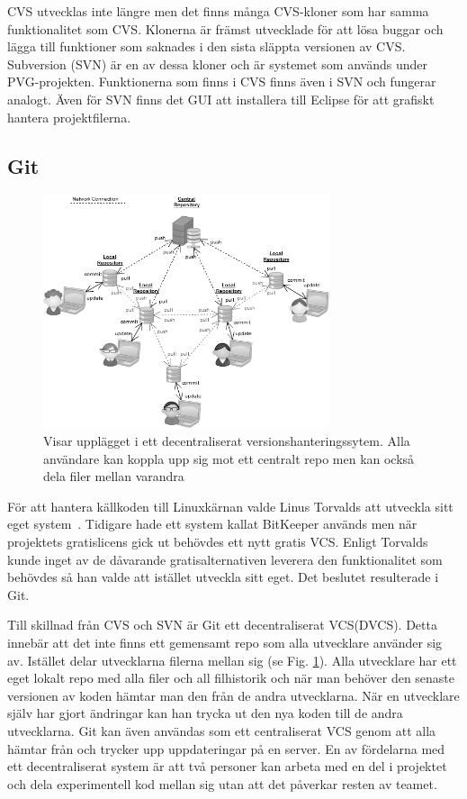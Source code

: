 	CVS utvecklas inte längre men det finns många CVS-kloner som har samma funktionalitet som CVS. Klonerna är främst utvecklade för att lösa buggar och lägga till funktioner som saknades i den sista släppta versionen av CVS. Subversion (SVN) är en av dessa kloner och är systemet som används under PVG-projekten. Funktionerna som finns i CVS finns även i SVN och fungerar analogt. Även för SVN finns det GUI att installera till Eclipse för att grafiskt hantera projektfilerna. 
 

\subsection{Git}

\begin{figure}[htb!]\centering\includegraphics[width=0.75\textwidth]{DVCS.png}\caption{Visar upplägget i ett decentraliserat versionshanteringssytem. Alla användare kan koppla upp sig mot ett centralt repo men kan också dela filer mellan varandra}\label{fig:DVCSPic}\end{figure}


För att hantera källkoden till Linuxkärnan valde Linus Torvalds att utveckla sitt eget system~\cite{Torvalds}. Tidigare hade ett system kallat BitKeeper används men när projektets gratislicens gick ut behövdes ett nytt gratis VCS. Enligt Torvalds kunde inget av de dåvarande gratisalternativen leverera den funktionalitet som behövdes så han valde att istället utveckla sitt eget. Det beslutet resulterade i Git.

Till skillnad från CVS och SVN är Git ett decentraliserat VCS(DVCS). Detta innebär att det inte finns ett gemensamt repo som alla utvecklare använder sig av. Istället delar utvecklarna filerna mellan sig (se Fig. \ref{fig:DVCSPic}). Alla utvecklare har ett eget lokalt repo med alla filer och all filhistorik och när man behöver den senaste versionen av koden hämtar man den från de andra utvecklarna. När en utvecklare själv har gjort ändringar kan han trycka ut den nya koden till de andra utvecklarna. Git kan även användas som ett centraliserat VCS genom att alla hämtar från och trycker upp uppdateringar på en server. En av fördelarna med ett decentraliserat system är att två personer kan arbeta med en del i projektet och dela experimentell kod mellan sig utan att det påverkar resten av teamet. 

